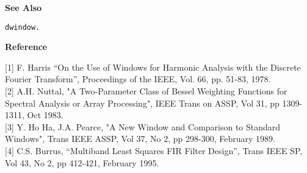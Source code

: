 {\bf \large \sf See Also}\\
\hspace*{1.5cm}
\begin{minipage}[t]{13.5cm}
\begin{verbatim}
dwindow.
\end{verbatim}
\end{minipage}
\vspace*{.5cm}


{\bf \large \sf Reference}\\
\hspace*{1.5cm}
\begin{minipage}[t]{13.5cm}
[1] F. Harris ``On the Use of Windows for Harmonic Analysis with the
Discrete Fourier Transform'', Proceedings of the IEEE, Vol. 66, pp. 51-83,
1978.\\

[2] A.H. Nuttal, "A Two-Parameter Class of Bessel Weighting 
	Functions for Spectral Analysis or Array Processing", 
	IEEE Trans on ASSP, Vol 31, pp 1309-1311, Oct 1983.\\

[3] Y. Ho Ha, J.A. Pearce, "A New Window and Comparison to
	Standard Windows", Trans IEEE ASSP, Vol 37, No 2, 
	pp 298-300, February 1989.\\

[4] C.S. Burrus, ``Multiband Least Squares FIR Filter Design'',
	Trans IEEE SP, Vol 43, No 2, pp 412-421, February 1995.
\end{minipage}

